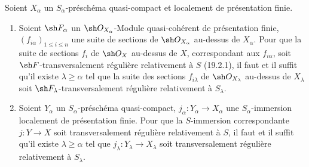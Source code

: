 \begin{proposition}[19.8.2]
\label{IV.19.8.2}
Soient $X_\alpha$ un $S_\alpha$-préschéma quasi-compact et localement de présentation finie.
\begin{enumerate}
  \item[\textup{(i)}] Soient $\sh F_\alpha$ un $\sh O_{X_\alpha}$-Module quasi-cohérent de présentation finie, $(f_{i\alpha})_{1\leq i\leq n}$ une suite de sections de $\sh O_{X_\alpha}$ au-dessus de $X_\alpha$. Pour que la suite de sections $f_i$ de $\sh O_X$ au-dessus de $X$, correspondant aux $f_{i\alpha}$, soit $\sh F$-transversalement régulière relativement à $S$ \textup{(19.2.1)}, il faut et il suffit qu'il existe $\lambda\geq\alpha$ tel que la suite des sections $f_{i\lambda}$ de $\sh O_{X_\lambda}$ au-dessus de $X_\lambda$ soit $\sh F_\lambda$-transversalement régulière relativement à $S_\lambda$.
  \item[\textup{(ii)}] Soient $Y_\alpha$ un $S_\alpha$-préschéma quasi-compact, $j_\alpha:Y_\alpha\to X_\alpha$ une $S_\alpha$-immersion localement
  de présentation finie. Pour que la $S$-immersion correspondante $j:Y\to X$ soit transversalement régulière relativement à $S$, il faut et il suffit qu'il existe $\lambda\geq\alpha$ tel que $j_\lambda:Y_\lambda\to X_\lambda$ soit transversalement régulière relativement à $S_\lambda$.
\end{enumerate}
\end{proposition}

